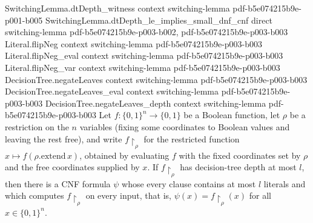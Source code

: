 \begin{theorem}
  {SwitchingLemma.dtDepth_witness}
  {context}
  {switching-lemma}
  {pdf-b5e074215b9e-p001-b005}
\proofstep
  {SwitchingLemma.dtDepth_le_implies_small_dnf_cnf}
  {direct}
  {switching-lemma}
  {pdf-b5e074215b9e-p003-b002,
    pdf-b5e074215b9e-p003-b003}
\proofstep
  {Literal.flipNeg}
  {context}
  {switching-lemma}
  {pdf-b5e074215b9e-p003-b003}
\proofstep
  {Literal.flipNeg_eval}
  {context}
  {switching-lemma}
  {pdf-b5e074215b9e-p003-b003}
\proofstep
  {Literal.flipNeg_var}
  {context}
  {switching-lemma}
  {pdf-b5e074215b9e-p003-b003}
\proofstep
  {DecisionTree.negateLeaves}
  {context}
  {switching-lemma}
  {pdf-b5e074215b9e-p003-b003}
\proofstep
  {DecisionTree.negateLeaves_eval}
  {context}
  {switching-lemma}
  {pdf-b5e074215b9e-p003-b003}
\proofstep
  {DecisionTree.negateLeaves_depth}
  {context}
  {switching-lemma}
  {pdf-b5e074215b9e-p003-b003}
Let $f : \{0,1\}^n \to \{0,1\}$ be a Boolean function, let $\rho$ be a restriction on
the $n$ variables (fixing some coordinates to Boolean values and leaving the rest free),
and write $f\!\restriction_\rho$ for the restricted function $x \mapsto
f(\rho.\mathrm{extend}\,x)$, obtained by evaluating $f$ with the fixed coordinates set
by $\rho$ and the free coordinates supplied by $x$. If $f\!\restriction_\rho$ has
decision-tree depth at most $l$, then there is a CNF formula $\psi$ whose every clause
contains at most $l$ literals and which computes $f\!\restriction_\rho$ on every input,
that is, $\psi(x) = f\!\restriction_\rho(x)$ for all $x \in \{0,1\}^n$.
\end{theorem}

